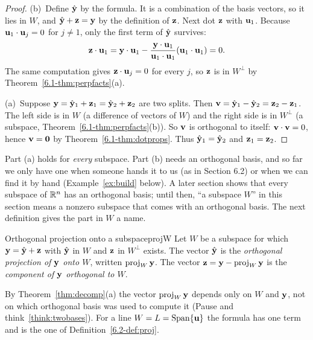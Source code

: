 \documentclass[11pt]{article}
\begin{document}
\begin{proof}
(b)~Define $\hat{\mathbf{y}}$ by the formula. It is a combination of the basis vectors, so it lies in $W$, and $\hat{\mathbf{y}}+\mathbf{z}=\mathbf{y}$ by the definition of $\mathbf{z}$. Next dot $\mathbf{z}$ with $\mathbf{u}_1$. Because $\mathbf{u}_1\cdot\mathbf{u}_j=0$ for $j\neq1$, only the first term of $\hat{\mathbf{y}}$ survives:
\[
\mathbf{z}\cdot\mathbf{u}_1=\mathbf{y}\cdot\mathbf{u}_1-\frac{\mathbf{y}\cdot\mathbf{u}_1}{\mathbf{u}_1\cdot\mathbf{u}_1}(\mathbf{u}_1\cdot\mathbf{u}_1)=0 .
\]
The same computation gives $\mathbf{z}\cdot\mathbf{u}_j=0$ for every $j$, so $\mathbf{z}$ is in $W^{\perp}$ by Theorem~\ref{6.1-thm:perpfacts}(a).

(a)~Suppose $\mathbf{y}=\hat{\mathbf{y}}_1+\mathbf{z}_1=\hat{\mathbf{y}}_2+\mathbf{z}_2$ are two splits. Then $\mathbf{v}=\hat{\mathbf{y}}_1-\hat{\mathbf{y}}_2=\mathbf{z}_2-\mathbf{z}_1$. The left side is in $W$ (a difference of vectors of $W$) and the right side is in $W^{\perp}$ (a subspace, Theorem~\ref{6.1-thm:perpfacts}(b)). So $\mathbf{v}$ is orthogonal to itself: $\mathbf{v}\cdot\mathbf{v}=0$, hence $\mathbf{v}=\mathbf{0}$ by Theorem~\ref{6.1-thm:dotprops}. Thus $\hat{\mathbf{y}}_1=\hat{\mathbf{y}}_2$ and $\mathbf{z}_1=\mathbf{z}_2$.
\end{proof}

Part (a) holds for \emph{every} subspace. Part (b) needs an orthogonal basis, and so far we only have one when someone hands it to us (as in Section 6.2) or when we can find it by hand (Example~\ref{ex:build} below). A later section shows that every subspace of $\mathbb{R}^n$ has an orthogonal basis; until then, ``a subspace $W$'' in this section means a nonzero subspace that comes with an orthogonal basis. The next definition gives the part in $W$ a name.

\begin{defn}{Orthogonal projection onto a subspace}{projW}
Let $W$ be a subspace for which $\mathbf{y}=\hat{\mathbf{y}}+\mathbf{z}$ with $\hat{\mathbf{y}}$ in $W$ and $\mathbf{z}$ in $W^{\perp}$ exists. The vector $\hat{\mathbf{y}}$ is the \emph{orthogonal projection of $\mathbf{y}$ onto $W$}, written $\operatorname{proj}_W\mathbf{y}$. The vector $\mathbf{z}=\mathbf{y}-\operatorname{proj}_W\mathbf{y}$ is the \emph{component of $\mathbf{y}$ orthogonal to $W$}.
\end{defn}

By Theorem~\ref{thm:decomp}(a) the vector $\operatorname{proj}_W\mathbf{y}$ depends only on $W$ and $\mathbf{y}$, not on which orthogonal basis was used to compute it (Pause and think~\ref{think:twobases}). For a line $W=L=\operatorname{Span}\{\mathbf{u}\}$ the formula has one term and is the one of Definition~\ref{6.2-def:proj}.

\begin{center}
\end{center}
\end{document}
